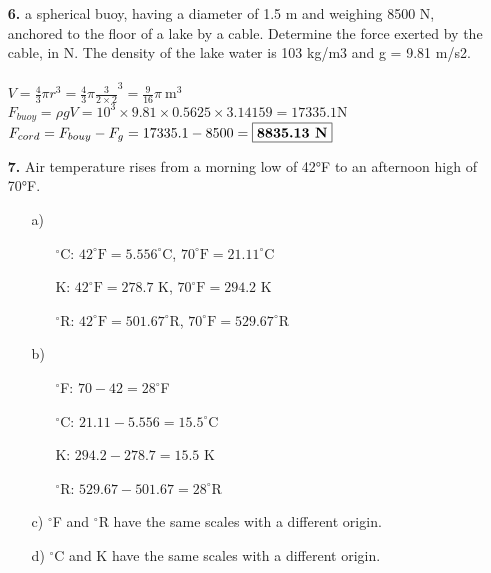 \documentclass{article}
\begin{document}
\begin{itemize}
\begin{itemize}
    \end{itemize}
    \newpage
    \item [\textbf{6.}] a spherical buoy, having a diameter of 1.5 m and weighing 8500 N, anchored to the floor of a lake by a cable. Determine the force exerted by the cable, in N. The density of
    the lake water is 103 kg/m3 and g = 9.81 m/s2.
    \\ \\
    \(V = \frac{4}{3}\pi r^3 = \frac{4}{3}\pi \frac{3}{2\times 2}^3=\frac{9}{16}\pi \ \text{m}^3\)\\
    \(F_{buoy} = \rho g V = 10^3\times 9.81\times 0.5625 \times 3.14159 = 17335.1 \text{N}\)\\
    \(F_{cord} = F_{bouy} - F_g = 17335.1 - 8500 =\fbox{\textbf{8835.13\text{ N}}}\)
    \item [\textbf{7.}] Air temperature rises from a morning low of 42°F to
    an afternoon high of 70°F.
    \begin{itemize}
        \item [a)]
        \begin{itemize}
            \item [\(^\circ\)C:] \(42^\circ\text{F}=5.556^\circ\)C, \(70^\circ\text{F}=21.11^\circ\)C
            \item [K:] \(42^\circ\text{F}=278.7\) K, \(70^\circ\text{F}=294.2\) K
            \item [\(^\circ\)R:] \(42^\circ\text{F}=501.67^\circ\)R, \(70^\circ\text{F}=529.67^\circ\)R
        \end{itemize}
        \item [b)]
        \begin{itemize}
            \item [\(^\circ\)F:] \(70-42 = 28^\circ\)F
            \item [\(^\circ\)C:] \(21.11-5.556 = 15.5^\circ\)C
            \item [K:] \(294.2-278.7=15.5\) K
            \item [\(^\circ\)R:] \(529.67-501.67 = 28^\circ\)R
        \end{itemize}
        \item [c)] \(^\circ\)F and \(^\circ\)R have the same scales with a different origin.
        \item [d)] \(^\circ\)C and K have the same scales with a different origin.
    \end{itemize}
\end{itemize}
\end{document}
